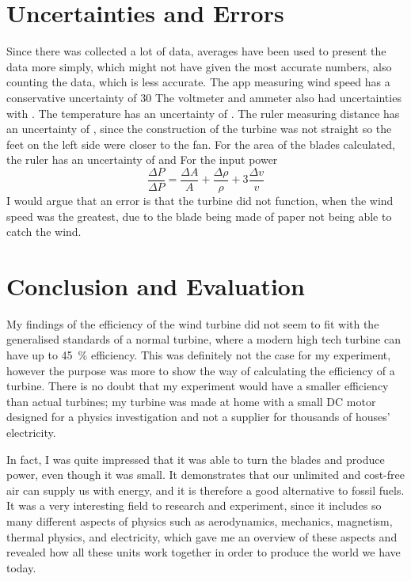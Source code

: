 \documentclass[12pt]{article}
\begin{document}
\section{Uncertainties and Errors}
Since there was collected a lot of data, averages have been used to present the data more simply, which might not have given the most accurate numbers, also counting the data, which is less accurate.
The app measuring wind speed has a conservative uncertainty of 30%
The voltmeter and ammeter also had uncertainties with .
The temperature has an uncertainty of .
The ruler measuring distance has an uncertainty of , since the construction of the turbine was not straight so the feet on the left side were closer to the fan.
For the area of the blades calculated, the ruler has an uncertainty of  and  
For the input power
\begin{equation}
	\frac{\Delta P}{\Delta P} = \frac{\Delta A}{A} + \frac{\Delta \rho}{\rho} + 3 \frac{\Delta v}{v}
	\label{equation:PowerError}
\end{equation}
I would argue that an error is that the turbine did not function, when the wind speed was the greatest, due to the blade being made of paper not being able to catch the wind.

\section{Conclusion and Evaluation}
My findings of the efficiency of the wind turbine did not seem to fit with the generalised standards of a normal turbine, where a modern high tech turbine can have up to \SI{45}{\percent} efficiency.
This was definitely not the case for my experiment, however the purpose was more to show the way of calculating the efficiency of a turbine.
There is no doubt that my experiment would have a smaller efficiency than actual turbines; my turbine was made at home with a small DC motor designed for a physics investigation and not a supplier for thousands of houses' electricity.

In fact, I was quite impressed that it was able to turn the blades and produce power, even though it was small.
It demonstrates that our unlimited and cost-free air can supply us with energy, and it is therefore a good alternative to fossil fuels.
It was a very interesting field to research and experiment, since it includes so many different aspects of physics such as aerodynamics, mechanics, magnetism, thermal physics, and electricity, which gave me an overview of these aspects and revealed how all these units work together in order to produce the world we have today.
\end{document}
